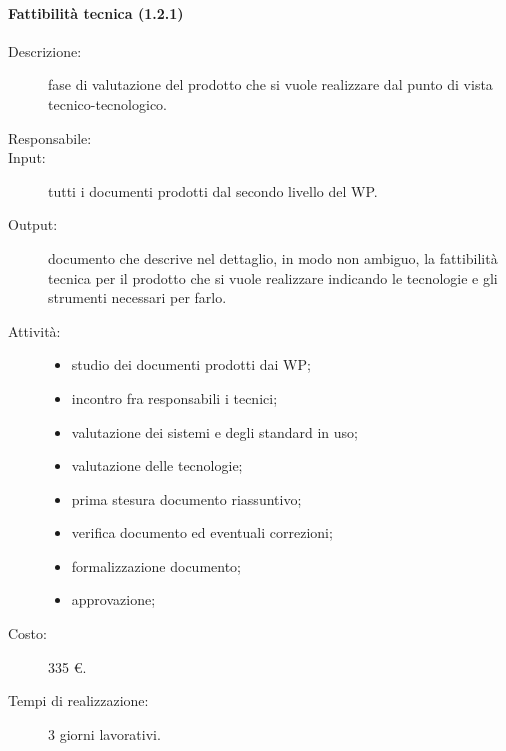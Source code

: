 \paragraph{Fattibilit\`{a} tecnica (1.2.1)}
\begin{description}
\item[Descrizione:] fase di valutazione del prodotto che si vuole realizzare dal punto di vista tecnico-tecnologico.
\item[Responsabile:] 
\item[Input:] tutti i documenti prodotti dal secondo livello del WP.
\item[Output:] documento che descrive nel dettaglio, in modo non ambiguo, la fattibilit\`{a} tecnica per il prodotto che si vuole realizzare indicando le tecnologie e gli strumenti necessari per farlo.
\item[Attivit\`{a}:] 
\begin{center}
\begin{itemize}
\item studio dei documenti prodotti dai WP;
\item incontro fra responsabili i tecnici;
\item valutazione dei sistemi e degli standard in uso;
\item valutazione delle tecnologie;
\item prima stesura documento riassuntivo;
\item verifica documento ed eventuali correzioni;
\item formalizzazione documento;
\item approvazione;
\end{itemize}
\end{center}
\item[Costo:] 335 \euro{}.
\item[Tempi di realizzazione:] 3 giorni lavorativi.
\end{description}

